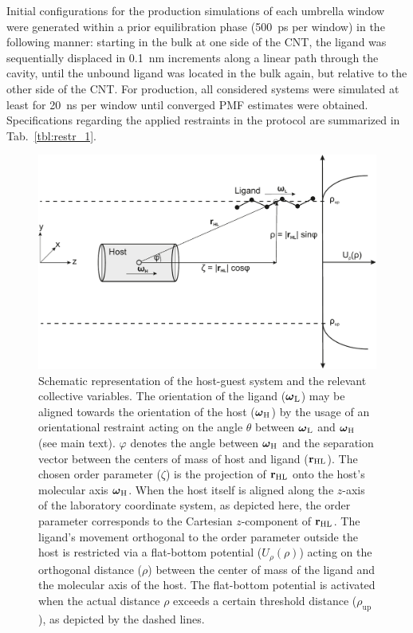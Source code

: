\documentclass[9pt,lessons,pubversion]{livecoms}
\begin{document}
Initial configurations for the production simulations of each umbrella window were generated within a prior equilibration phase (500~ps per window) in the following manner:
starting in the bulk at one side of the CNT, the ligand was sequentially displaced in 0.1~nm increments 
along a linear path through the cavity, until the unbound ligand was located in the bulk again, but relative to the other side of the CNT.
For production, all considered systems were simulated at least for 20~ns per window until converged PMF estimates were obtained.
Specifications regarding the applied restraints in the protocol are summarized in Tab.~\ref{tbl:restr_1}.

\begin{figure}[htb!]
\includegraphics[width=\linewidth]{figures/sketch_simulation_protocol.pdf}
\caption{Schematic representation of the host-guest system and the relevant collective variables. 
The orientation of the ligand ($\text{\boldmath$\omega$}_\mathrm{L}$) may be aligned towards the orientation of the host ($\text{\boldmath$\omega$}_\mathrm{H}$) by the usage of an orientational restraint 
acting on the angle $\theta$ between $\text{\boldmath$\omega$}_\mathrm{L}$ and $\text{\boldmath$\omega$}_\mathrm{H}$ (see main text).
$\varphi$ denotes the angle between $\text{\boldmath$\omega$}_\mathrm{H}$ and the separation vector between the centers of mass of host and ligand ($\bf{r}_\mathrm{HL}$). 
The chosen order parameter ($\zeta$) is the projection of $\bf{r}_\mathrm{HL}$ onto the host's molecular axis $\text{\boldmath$\omega$}_\mathrm{H}$.
When the host itself is aligned along the $z$-axis of the laboratory coordinate system, as depicted here, the order parameter corresponds to the Cartesian $z$-component of $\bf{r}_\mathrm{HL}$. 
The ligand's movement orthogonal to the order parameter outside the host is restricted via a  flat-bottom potential ($U_\rho(\rho)$) acting on the orthogonal distance ($\rho$) 
between the center of mass of the ligand and the molecular axis of the host. 
The flat-bottom potential is activated when the actual distance $\rho$ exceeds a certain threshold distance ($\rho_\mathrm{up}$), as depicted by the dashed lines.}
\label{fig:host_guest_sketch}
\end{figure}
\end{document}
